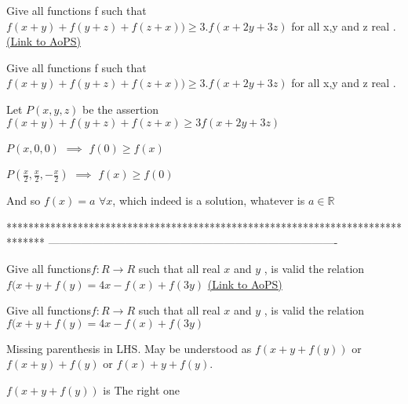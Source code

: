 \begin{problem}
	Give all functions f such that  $ f(x+y)+f(y+z)+f(z+x))\geq 3.f(x+2y+3z) $  for all x,y and z real .
	\flushright \href{https://artofproblemsolving.com/community/c6h587770}{(Link to AoPS)}
\end{problem}



\begin{solution}
	\begin{tcolorbox}Give all functions f such that  $ f(x+y)+f(y+z)+f(z+x))\geq 3.f(x+2y+3z) $  for all x,y and z real .\end{tcolorbox}
Let $P(x,y,z)$ be the assertion $f(x+y)+f(y+z)+f(z+x)\ge 3f(x+2y+3z)$

$P(x,0,0)$ $\implies$ $f(0)\ge f(x)$

$P(\frac x2,\frac x2,-\frac x2)$ $\implies$ $f(x)\ge f(0)$

And so $\boxed{f(x)=a}$ $\forall x$, which indeed is a solution, whatever is $a\in\mathbb R$
\end{solution}
*******************************************************************************
-------------------------------------------------------------------------------

\begin{problem}
	Give all functions$ f:R\rightarrow R $ such that all real $ x $ and $ y $  , is valid the relation $ f(x+y+f(y)=4x-f(x)+f(3y) $
	\flushright \href{https://artofproblemsolving.com/community/c6h587775}{(Link to AoPS)}
\end{problem}



\begin{solution}
	\begin{tcolorbox}Give all functions$ f:R\rightarrow R $ such that all real $ x $ and $ y $  , is valid the relation $ f(x+y+f(y)=4x-f(x)+f(3y) $\end{tcolorbox}
Missing parenthesis in LHS. May be understood as $f(x+y+f(y))$ or $f(x+y)+f(y)$ or $f(x)+y+f(y)$.
\end{solution}



\begin{solution}
	$f(x+y +f(y)) $ is The right one
\end{solution}



